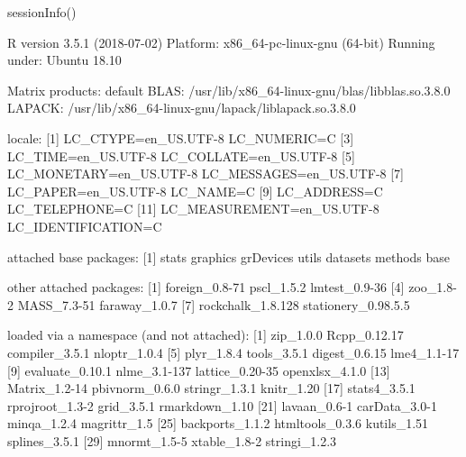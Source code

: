 \begin{Schunk}
\begin{Sinput}
 sessionInfo()
\end{Sinput}
\begin{Soutput}
R version 3.5.1 (2018-07-02)
Platform: x86_64-pc-linux-gnu (64-bit)
Running under: Ubuntu 18.10

Matrix products: default
BLAS: /usr/lib/x86_64-linux-gnu/blas/libblas.so.3.8.0
LAPACK: /usr/lib/x86_64-linux-gnu/lapack/liblapack.so.3.8.0

locale:
 [1] LC_CTYPE=en_US.UTF-8       LC_NUMERIC=C              
 [3] LC_TIME=en_US.UTF-8        LC_COLLATE=en_US.UTF-8    
 [5] LC_MONETARY=en_US.UTF-8    LC_MESSAGES=en_US.UTF-8   
 [7] LC_PAPER=en_US.UTF-8       LC_NAME=C                 
 [9] LC_ADDRESS=C               LC_TELEPHONE=C            
[11] LC_MEASUREMENT=en_US.UTF-8 LC_IDENTIFICATION=C       

attached base packages:
[1] stats     graphics  grDevices utils     datasets  methods   base     

other attached packages:
[1] foreign_0.8-71      pscl_1.5.2          lmtest_0.9-36      
[4] zoo_1.8-2           MASS_7.3-51         faraway_1.0.7      
[7] rockchalk_1.8.128   stationery_0.98.5.5

loaded via a namespace (and not attached):
 [1] zip_1.0.0       Rcpp_0.12.17    compiler_3.5.1  nloptr_1.0.4   
 [5] plyr_1.8.4      tools_3.5.1     digest_0.6.15   lme4_1.1-17    
 [9] evaluate_0.10.1 nlme_3.1-137    lattice_0.20-35 openxlsx_4.1.0 
[13] Matrix_1.2-14   pbivnorm_0.6.0  stringr_1.3.1   knitr_1.20     
[17] stats4_3.5.1    rprojroot_1.3-2 grid_3.5.1      rmarkdown_1.10 
[21] lavaan_0.6-1    carData_3.0-1   minqa_1.2.4     magrittr_1.5   
[25] backports_1.1.2 htmltools_0.3.6 kutils_1.51     splines_3.5.1  
[29] mnormt_1.5-5    xtable_1.8-2    stringi_1.2.3  
\end{Soutput}
\end{Schunk}
